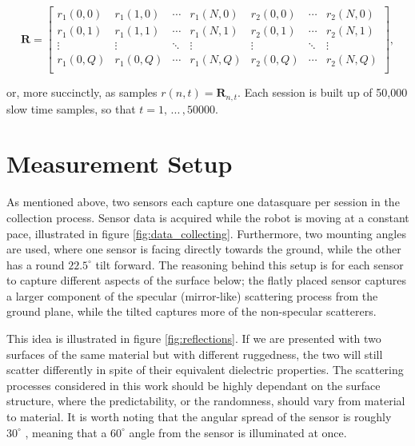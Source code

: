 \begin{equation}
	\mathbf{R}= 
	\begin{bmatrix}
		r_1(0,0) & r_1(1,0) & \cdots & r_1(N,0) & r_2(0,0) & \cdots & r_2(N,0) \\
		r_1(0,1) & r_1(1,1) & \cdots & r_1(N,1) & r_2(0,1) & \cdots & r_2(N,1) \\
		\vdots &  \vdots & \ddots & \vdots & \vdots & \ddots &  \vdots \\
		r_1(0,Q) & r_1(0,Q) & \cdots  & r_1(N,Q) & r_2(0,Q) & \cdots  & r_2(N,Q) \\
	\end{bmatrix}
	,
\end{equation}

or, more succinctly, as samples $r(n,t) = \mathbf{R}_{n,t}$. Each session is built up of 50,000 slow time samples, so that $t=1,\,...\,,50000$.

\section{Measurement Setup}



As mentioned above, two sensors each capture one datasquare per session in the collection process. Sensor data is acquired while the robot is moving at a constant pace, illustrated in figure \ref{fig:data_collecting}. Furthermore, two mounting angles are used, where one sensor is facing directly towards the ground, while the other has a round $22.5^\circ$ tilt forward. The reasoning behind this setup is for each sensor to capture different aspects of the surface below; the flatly placed sensor captures a larger component of the specular (mirror-like) scattering process from the ground plane, while the tilted captures more of the non-specular scatterers. 

This idea is illustrated in figure \ref{fig:reflections}. If we are presented with two surfaces of the same material but with different ruggedness, the two will still scatter differently in spite of their equivalent dielectric properties. The scattering processes considered in this work should be highly dependant on the surface structure, where the predictability, or the randomness, should vary from material to material. It is worth noting that the angular spread of the sensor is roughly $30^\circ$ \citep{acconeer_datasheet_a111}, meaning that a $60^\circ$ angle from the sensor is illuminated at once. 

